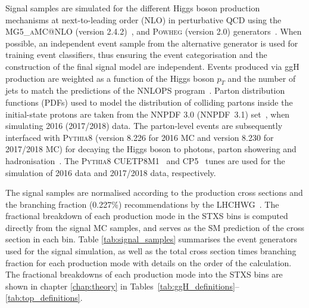 Signal samples are simulated for the different Higgs boson production mechanisms at next-to-leading order (NLO) in perturbative QCD using the \textsc{MG5\_aMC@NLO} (version 2.4.2)~\cite{Alwall:2014hca}, and \textsc{Powheg} (version 2.0) generators~\cite{Nason:2004rx,Frixione:2007vw,Alioli:2008tz,Nason:2009ai,Alioli:2010xd,Hartanto:2015uka}. When possible, an independent event sample from the alternative generator is used for training event classifiers, thus ensuring the event categorisation and the construction of the final signal model are independent. Events produced via ggH production are weighted as a function of the Higgs boson $p_T$ and the number of jets to match the predictions of the NNLOPS program~\cite{Hamilton:2013fea}. Parton distribution functions (PDFs) used to model the distribution of colliding partons inside the initial-state protons are taken from the NNPDF 3.0 (NNPDF~3.1) set~\cite{Ball:2014uwa,Ball:2017nwa}, when simulating 2016 (2017/2018) data. The parton-level events are subsequently interfaced with \textsc{Pythia8} (version 8.226 for 2016 MC and version 8.230 for 2017/2018 MC) for decaying the Higgs boson to photons, parton showering and hadronisation~\cite{Sjostrand:2014zea}. The \textsc{Pythia8} CUETP8M1~\cite{Khachatryan:2015pea} and CP5~\cite{Sirunyan:2019dfx} tunes are used for the simulation of 2016 data and 2017/2018 data, respectively.

The signal samples are normalised according to the production cross sections and the \Hgg branching fraction (0.227\%) recommendations by the LHCHWG~\cite{deFlorian:2016spz}. The fractional breakdown of each production mode in the STXS bins is computed directly from the signal MC samples, and serves as the SM prediction of the cross section in each bin. Table \ref{tab:signal_samples} summarises the event generators used for the signal simulation, as well as the total cross section times branching fraction for each production mode with details on the order of the calculation. The fractional breakdowns of each production mode into the STXS bins are shown in chapter \ref{chap:theory} in Tables~\ref{tab:ggH_definitions}--\ref{tab:top_definitions}.

